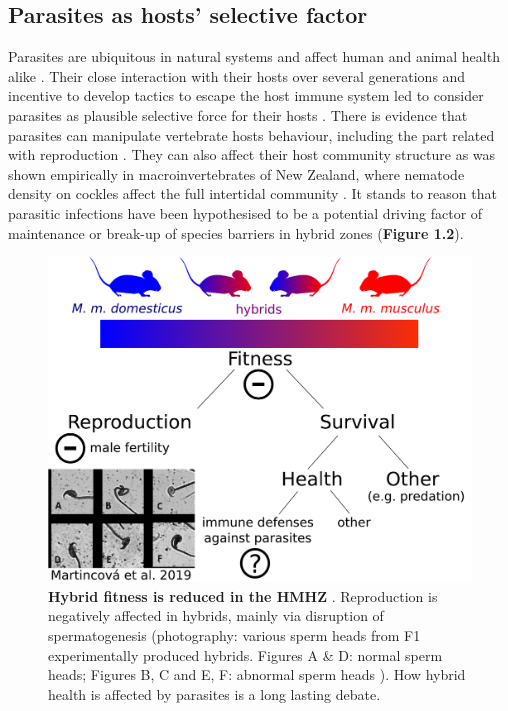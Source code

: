 \subsection{Parasites as hosts’ selective factor}
Parasites are ubiquitous in natural systems and affect human and animal health alike \citep{schurer_community-based_2016}. Their close interaction with their hosts over several generations and incentive to develop tactics to escape the host immune system led to consider parasites as plausible selective force for their hosts \citep{schmid-hempel_parasitesnew_2009}. There is evidence that parasites can manipulate vertebrate hosts behaviour, including the part related with reproduction \citep{klein_parasite_2003}. They can also affect their host community structure as was shown empirically in macroinvertebrates of New Zealand, where nematode density on cockles affect the full intertidal community \citep{mouritsen_parasites_2005}. It stands to reason that parasitic infections have been hypothesised to be a potential driving factor of maintenance or break-up of species barriers in hybrid zones \citep{sage_wormy_1986} (\textbf{Figure 1.2}).

\begin{figure}[H]
    \centering
     \includegraphics[width=.7\linewidth,height=\textheight,keepaspectratio]{images/1introduction/Figure2.pdf}
    \caption{\textbf{Hybrid fitness is reduced in the HMHZ} \citep{baird_what_2012}. Reproduction is negatively affected in hybrids, mainly via disruption of spermatogenesis (photography: various sperm heads from F1 experimentally produced hybrids. Figures A \& D: normal sperm heads; Figures B, C and E, F: abnormal sperm heads \parencite[source:][]{martincova_sperm_2019}). How hybrid health is affected by parasites is a long lasting debate.}
\end{figure}

